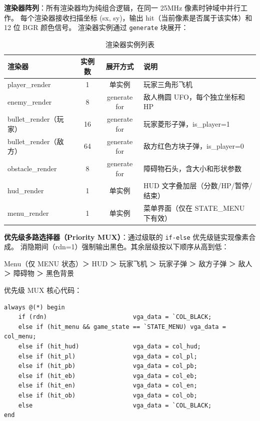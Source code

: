 \documentclass[12pt,a4paper]{ctexart}
\begin{document}
\textbf{渲染器阵列}：所有渲染器均为纯组合逻辑，在同一 25MHz 像素时钟域中并行工作。
每个渲染器接收扫描坐标 (sx, sy)，输出 hit（当前像素是否属于该实体）和 12 位 BGR 颜色信号。
渲染器实例通过 \texttt{generate} 块展开：

\begin{table}[H]
\centering
\caption{渲染器实例列表}
\label{tab:renderers}
\begin{tabular}{lccp{4cm}}
\toprule
\textbf{渲染器} & \textbf{实例数} & \textbf{展开方式} & \textbf{说明} \\
\midrule
player\_render & 1 & 单实例 & 玩家三角形飞机 \\
enemy\_render & 8 & generate for & 敌人椭圆 UFO，每个独立坐标和 HP \\
bullet\_render（玩家） & 16 & generate for & 玩家菱形子弹，is\_player=1 \\
bullet\_render（敌方） & 64 & generate for & 敌方红色方块子弹，is\_player=0 \\
obstacle\_render & 8 & generate for & 障碍物石头，含大小和形状参数 \\
hud\_render & 1 & 单实例 & HUD 文字叠加层（分数/HP/暂停/结束） \\
menu\_render & 1 & 单实例 & 菜单界面（仅在 STATE\_MENU 下有效） \\
\bottomrule
\end{tabular}
\end{table}

\textbf{优先级多路选择器（Priority MUX）}：通过级联的 \texttt{if-else} 优先级链实现像素合成。
消隐期间（rdn=1）强制输出黑色。其余层级按以下顺序从高到低：

\begin{center}
\small
Menu（仅 MENU 状态）＞ HUD ＞ 玩家飞机 ＞ 玩家子弹 ＞ 敌方子弹 ＞ 敌人 ＞ 障碍物 ＞ 黑色背景
\end{center}

优先级 MUX 核心代码：
\begin{lstlisting}
always @(*) begin
    if (rdn)                        vga_data = `COL_BLACK;
    else if (hit_menu && game_state == `STATE_MENU) vga_data = col_menu;
    else if (hit_hud)               vga_data = col_hud;
    else if (hit_pl)                vga_data = col_pl;
    else if (hit_pb)                vga_data = col_pb;
    else if (hit_eb)                vga_data = col_eb;
    else if (hit_en)                vga_data = col_en;
    else if (hit_ob)                vga_data = col_ob;
    else                            vga_data = `COL_BLACK;
end
\end{lstlisting}
\end{document}

